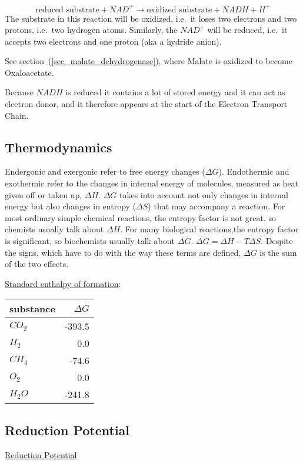 \documentclass[a4paper,14pt]{extarticle}
\begin{document}
\[
    \text{reduced substrate} + NAD^+ \rightarrow \text{oxidized substrate} + NADH + H^+
\]
The substrate in this reaction will be oxidized, i.e.\ it loses two electrons and two
protons, i.e.\ two hydrogen atoms. Similarly, the $NAD^+$ will be reduced, i.e.\ it
accepts two electrons and one proton (aka a hydride anion).

See section~(\ref{sec_malate_dehydrogenase}), where Malate is oxidized to become
Oxaloacetate.

Because $NADH$ is reduced it contains a lot of stored energy and it can act as electron
donor, and it therefore appears at the start of the Electron Transport Chain.


\subsection{Thermodynamics}\label{sec_thermodynamics}
Endergonic and exergonic refer to free energy changes ($\Delta G$). Endothermic and
exothermic refer to the changes in internal energy of molecules, measured as heat given
off or taken up, $\Delta H$. $\Delta G$ takes into account not only changes in internal energy
but also changes in entropy ($\Delta S$) that may accompany a reaction. For most ordinary
simple chemical reactions, the entropy factor is not great, so chemists usually talk about
$\Delta H$. For many biological reactions,the entropy factor is significant, so biochemists
usually talk about $\Delta G$. $\Delta G = \Delta H - T \Delta S $. Despite the signs, which
have to do with the way these terms are defined, $\Delta G$ is the sum of the two effects.

\href{https://en.wikipedia.org/wiki/Standard_enthalpy_of_formation}{Standard enthalpy of
formation}:

\begin{tabular}{l  r}         \toprule
    substance & $\Delta G$ \\ \midrule
    $CO_2$    & -393.5     \\
    $H_2$     & 0.0        \\
    $CH_4$    & -74.6      \\
    $O_2$     & 0.0        \\
    $H_2O$    & -241.8     \\ \bottomrule
\end{tabular}


\subsection{Reduction Potential}
\href{https://en.wikipedia.org/wiki/Table_of_standard_reduction_potentials_for_half-reactions_important_in_biochemistry}{Reduction
Potential}
\end{document}
